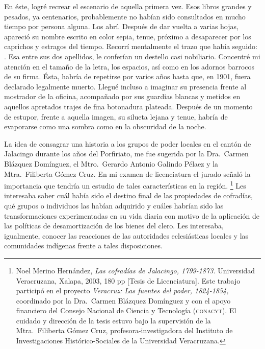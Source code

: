 \documentclass[14pt,twoside,final]{extbook} %
\let\oldfootnote\footnote
\renewcommand\footnote[1]{%
\oldfootnote{\hspace{1mm}#1}}
\begin{document}
En éste, logré recrear el escenario de aquella primera vez. Esos libros grandes y pesados, ya centenarios, probablemente no habían sido consultados en mucho tiempo por persona alguna. Los abrí. Después de dar vuelta a varias hojas, apareció su nombre escrito en color sepia, tenue, próximo a desaparecer por los caprichos y estragos del tiempo. Recorrí mentalmente el trazo que había seguido: . Esa \kern5pt entre sus dos apellidos, le conferían un destello casi nobiliario. Concentré mi atención en el tamaño de la letra, los espacios, así como en los adornos barrocos de su firma. Ésta, habría de repetirse por varios años hasta que, en 1901, fuera declarado legalmente muerto. Llegué incluso a imaginar su presencia frente al mostrador de la oficina, acompañado por sus guardias blancas y metidos en aquellos apretados trajes de fina botonadura plateada. Después de un momento de estupor, frente a aquella imagen, su silueta lejana y tenue, habría de evaporarse como una sombra como en la obscuridad de la noche.

La idea de consagrar una historia a los grupos de poder locales en el cantón de Jalacingo durante los años del Porfiriato, me fue sugerida por la Dra.~Carmen Blázquez Domínguez, el Mtro.~Gerardo Antonio Galindo Pélaez y la Mtra.~Filiberta Gómez Cruz. En mi examen de licenciatura el jurado señaló la importancia que tendría un estudio de tales características en la región.\footnote{Noel Merino Hernández, \emph{Las cofradías de Jalacingo, 1799-1873.} Universidad Veracruzana, Xalapa, 2003, 180 pp [Tesis de Licenciatura]. Este trabajo participó en el proyecto \emph{Veracruz: Las fuentes del poder, 1824-1854,} coordinado por la Dra.~Carmen Blázquez Domínguez y con el apoyo financiero del Consejo Nacional de Ciencia y Tecnología (\textsc{conacyt}). El cuidado y dirección de la tesis estuvo bajo la supervisión de la Mtra.~Filiberta Gómez Cruz, profesora-investigadora del Instituto de Investigaciones Histórico-Sociales de la Universidad Veracruzana.} Les interesaba saber cuál había sido el destino final de las propiedades de cofradías, qué grupos o individuos las habían adquirido y cuáles habrían sido las transformaciones experimentadas en su vida diaria con motivo de la aplicación de las políticas de desamortización de los bienes del clero. Les interesaba, igualmente, conocer las reacciones de las autoridades eclesiásticas locales y las comunidades indígenas frente a tales disposiciones.
\end{document}
